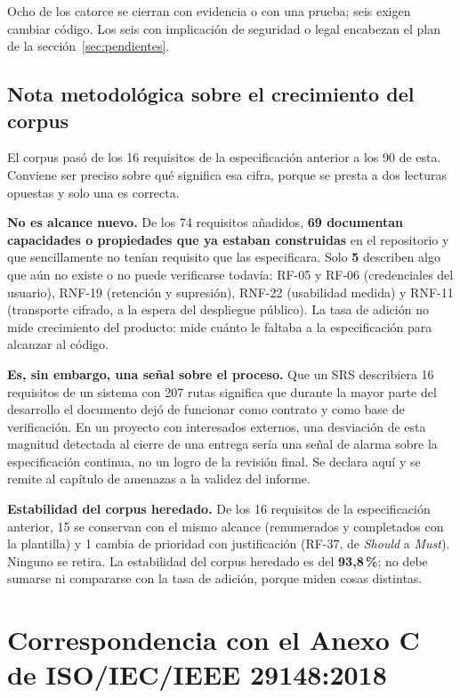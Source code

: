 \documentclass[11pt,a4paper]{article}
\begin{document}
\noindent Ocho de los catorce se cierran con evidencia o con una prueba; seis exigen cambiar
código. Los seis con implicación de seguridad o legal encabezan el plan de la
sección~\ref{sec:pendientes}.

\subsection{Nota metodológica sobre el crecimiento del corpus}

El corpus pasó de los 16 requisitos de la especificación anterior a los 90 de esta. Conviene ser preciso sobre
qué significa esa cifra, porque se presta a dos lecturas opuestas y solo una es correcta.

\textbf{No es alcance nuevo.} De los 74 requisitos añadidos, \textbf{69 documentan capacidades o
propiedades que ya estaban construidas} en el repositorio y que sencillamente no tenían requisito
que las especificara. Solo \textbf{5} describen algo que aún no existe o no puede verificarse
todavía: RF-05 y RF-06 (credenciales del usuario), RNF-19 (retención y supresión), RNF-22
(usabilidad medida) y RNF-11 (transporte cifrado, a la espera del despliegue público). La tasa de
adición no mide crecimiento del producto: mide cuánto le faltaba a la especificación para
alcanzar al código.

\textbf{Es, sin embargo, una señal sobre el proceso.} Que un SRS describiera 16 requisitos de un
sistema con 207 rutas significa que durante la mayor parte del desarrollo el documento dejó de
funcionar como contrato y como base de verificación. En un proyecto con interesados externos,
una desviación de esta magnitud detectada al cierre de una entrega sería una señal de alarma
sobre la especificación continua, no un logro de la revisión final. Se declara aquí y se remite
al capítulo de amenazas a la validez del informe.

\textbf{Estabilidad del corpus heredado.} De los 16 requisitos de la especificación anterior, 15 se
conservan con el mismo alcance (renumerados y completados con la plantilla) y 1 cambia de
prioridad con justificación (RF-37, de \emph{Should} a \emph{Must}). Ninguno se retira. La
estabilidad del corpus heredado es del \textbf{93,8\,\%}; no debe sumarse ni compararse con la
tasa de adición, porque miden cosas distintas.

\section{Correspondencia con el Anexo C de ISO/IEC/IEEE 29148:2018}
\label{sec:anexoc}
\end{document}
